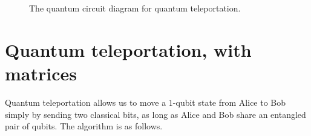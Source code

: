 \documentclass[12pt]{amsart}
\begin{document}
\begin{figure}
\caption{The quantum circuit diagram for quantum teleportation.}%
\label{fig:quantum-teleportation-circuit}
\end{figure}

\section{Quantum teleportation, with matrices}\label{sec:teleportation-matrices}


Quantum teleportation allows us to move a $1$-qubit state from Alice to Bob
simply by sending two classical bits, as long as Alice and Bob share an
entangled pair of qubits.  The algorithm is as follows.
\end{document}
